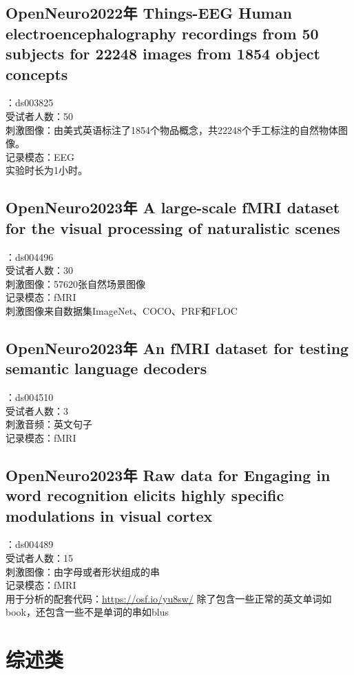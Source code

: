 \documentclass[12pt, a4paper, oneside]{ctexart}
\begin{document}
    \subsection{OpenNeuro2022年 Things-EEG Human electroencephalography recordings from 50 subjects for 22248 images from 1854 object concepts}
    ：ds003825\\
    受试者人数：50\\
    刺激图像：由美式英语标注了1854个物品概念，共22248个手工标注的自然物体图像。\\
    记录模态：EEG\\
    实验时长为1小时。

    \subsection{OpenNeuro2023年 A large-scale fMRI dataset for the visual processing of naturalistic scenes}
    ：ds004496\\
    受试者人数：30\\
    刺激图像：57620张自然场景图像\\
    记录模态：fMRI\\
    刺激图像来自数据集ImageNet、COCO、PRF和FLOC

    \subsection{OpenNeuro2023年 An fMRI dataset for testing semantic language decoders}
    ：ds004510\\
    受试者人数：3\\
    刺激音频：英文句子\\
    记录模态：fMRI

    \subsection{OpenNeuro2023年 Raw data for Engaging in word recognition elicits highly specific modulations in visual cortex}
    ：ds004489\\
    受试者人数：15\\
    刺激图像：由字母或者形状组成的串\\
    记录模态：fMRI\\
    用于分析的配套代码：\url{https://osf.io/yu8sw/}
    除了包含一些正常的英文单词如book，还包含一些不是单词的串如blus


    \section{综述类}
\end{document}
